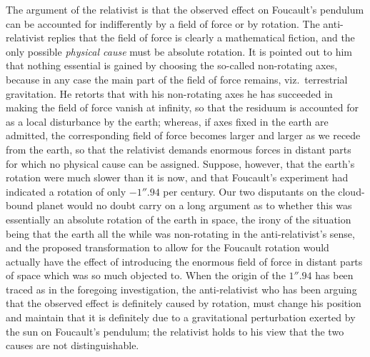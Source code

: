 \documentclass[12pt]{book}
\begin{document}
The argument of the relativist is that the observed effect on Foucault's
pendulum can be accounted for indifferently by a field of force or by rotation.
The anti\hyp{}relativist replies that the field of force is clearly a mathematical
fiction, and the only possible \emph{physical cause} must be absolute rotation. It is
pointed out to him that nothing essential is gained by choosing the so\hyp{}called
non\hyp{}rotating axes, because in any case the main part of the field of force
remains, viz.\ terrestrial gravitation. He retorts that with his non\hyp{}rotating
axes he has succeeded in making the field of force vanish at infinity, so that
the residuum is accounted for as a local disturbance by the earth; whereas,
if axes fixed in the earth are admitted, the corresponding field of force becomes
larger and larger as we recede from the earth, so that the relativist demands
enormous forces in distant parts for which no physical cause can be assigned.
Suppose, however, that the earth's rotation were much slower than it is now,
and that Foucault's experiment had indicated a rotation of only $-1''.94$ per
century. Our two disputants on the cloud-bound planet would no doubt carry
on a long argument as to whether this was essentially an absolute rotation of
the earth in space, the irony of the situation being that the earth all the while
was non\hyp{}rotating in the anti\hyp{}relativist's sense, and the proposed transformation
to allow for the Foucault rotation would actually have the effect of introducing
the enormous field of force in distant parts of space which was so much objected
to. When the origin of the $1''.94$ has been traced as in the foregoing investigation,
the anti\hyp{}relativist who has been arguing that the observed effect is
definitely caused by rotation, must change his position and maintain that it
is definitely due to a gravitational perturbation exerted by the sun on Foucault's
pendulum; the relativist holds to his view that the two causes are not
distinguishable.

%
\end{document}
